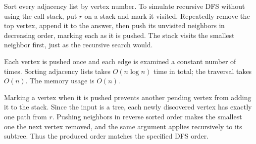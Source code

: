 Sort every adjacency list by vertex number. To simulate recursive DFS without using the call stack, put $r$ on a stack and mark it visited. Repeatedly remove the top vertex, append it to the answer, then push its unvisited neighbors in decreasing order, marking each as it is pushed. The stack visits the smallest neighbor first, just as the recursive search would.

Each vertex is pushed once and each edge is examined a constant number of times. Sorting adjacency lists takes $O(n \log n)$ time in total; the traversal takes $O(n)$. The memory usage is $O(n)$.

Marking a vertex when it is pushed prevents another pending vertex from adding it to the stack. Since the input is a tree, each newly discovered vertex has exactly one path from $r$. Pushing neighbors in reverse sorted order makes the smallest one the next vertex removed, and the same argument applies recursively to its subtree. Thus the produced order matches the specified DFS order.
